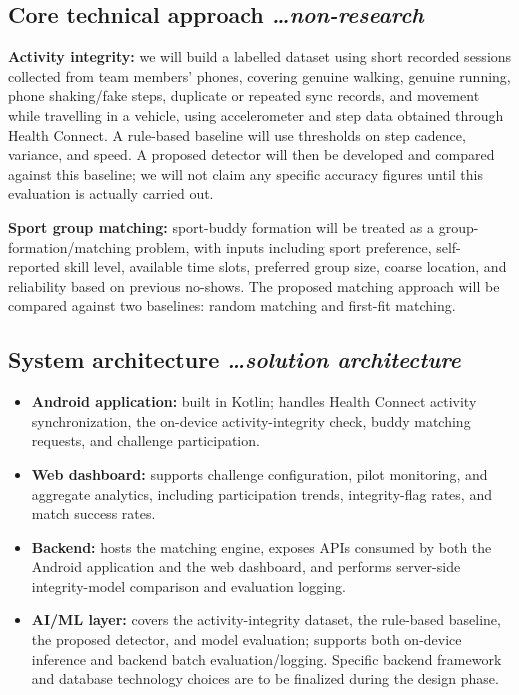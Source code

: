 \documentclass[11pt,a4paper]{article}
\newcommand{\BvrHint}[1]{%
  {\normalfont\normalsize\itshape\hfill #1}}
\begin{document}
\subsection{Core technical approach %
\BvrHint{\ldots non-research}}
\textbf{Activity integrity:} we will build a labelled dataset using
short recorded sessions collected from team members' phones, covering
genuine walking, genuine running, phone shaking/fake steps, duplicate or
repeated sync records, and movement while travelling in a vehicle, using
accelerometer and step data obtained through Health Connect. A
rule-based baseline will use thresholds on step cadence, variance, and
speed. A proposed detector will then be developed and compared against
this baseline; we will not claim any specific accuracy figures until
this evaluation is actually carried out.

\textbf{Sport group matching:} sport-buddy formation will be treated as
a group-formation/matching problem, with inputs including sport
preference, self-reported skill level, available time slots, preferred
group size, coarse location, and reliability based on previous
no-shows. The proposed matching approach will be compared against two
baselines: random matching and first-fit matching.

\subsection{System architecture %
\BvrHint{\ldots solution architecture}}
\begin{itemize}[leftmargin=0.7cm]
    \item \textbf{Android application:} built in Kotlin; handles Health Connect activity synchronization, the on-device activity-integrity check, buddy matching requests, and challenge participation.
    \item \textbf{Web dashboard:} supports challenge configuration, pilot monitoring, and aggregate analytics, including participation trends, integrity-flag rates, and match success rates.
    \item \textbf{Backend:} hosts the matching engine, exposes APIs consumed by both the Android application and the web dashboard, and performs server-side integrity-model comparison and evaluation logging.
    \item \textbf{AI/ML layer:} covers the activity-integrity dataset, the rule-based baseline, the proposed detector, and model evaluation; supports both on-device inference and backend batch evaluation/logging. Specific backend framework and database technology choices are to be finalized during the design phase.
\end{itemize}
\end{document}
